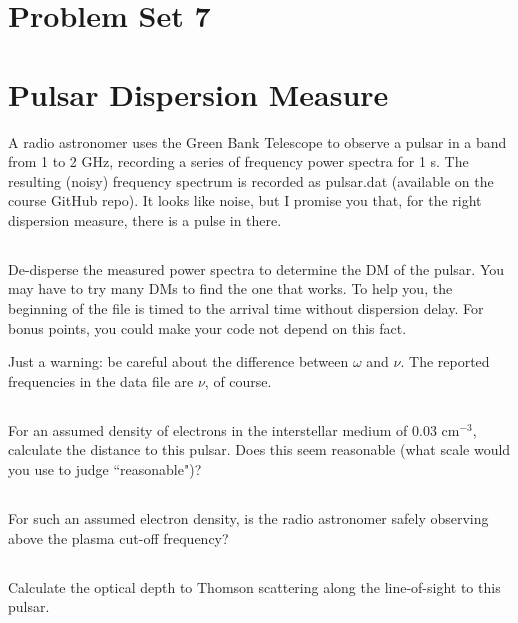 \documentclass[11pt]{article}
\begin{document}
\pagestyle{empty}

\section*{\centering Problem Set 7}

\section{Pulsar Dispersion Measure}

A radio astronomer uses the Green Bank Telescope to observe a pulsar
in a band from 1 to 2 GHz, recording a series of frequency power spectra for 1 s. The resulting
(noisy) frequency spectrum is recorded as pulsar.dat (available on the course GitHub repo).  It looks like
noise, but
I promise you that, for the right dispersion measure, there is a pulse in there.

\subsection{}
De-disperse the measured power spectra to determine the
DM of the pulsar.  You may have to try many DMs to find the one that works.
To help you, the beginning of the file is timed to the arrival time without dispersion delay.  For bonus
points, you could make your code not depend on this fact.

Just a warning: be careful about the difference between $\omega$ and $\nu$.  The reported frequencies in
the data file are $\nu$, of course.

\subsection{}
For an assumed density of electrons in the interstellar medium of 0.03 cm$^{-3}$, calculate the
distance to this pulsar. Does this seem reasonable (what scale would you use to judge ``reasonable")?

\subsection{}
For such an assumed electron density, is the radio astronomer safely observing above the plasma cut-off frequency?

\subsection{}
Calculate the optical depth to Thomson scattering along the line-of-sight to this pulsar.
\end{document}

